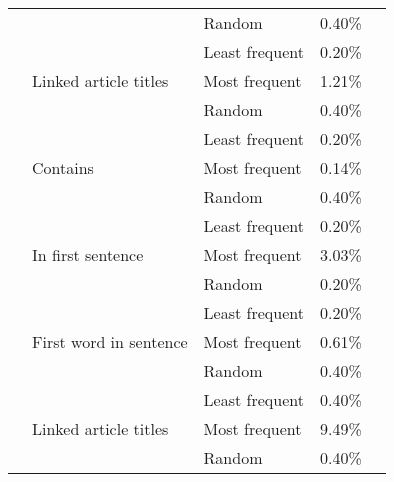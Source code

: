 \begin{center}
\begin{table}[h]
\begin{tabular}{cllll}
\multicolumn{1}{l}{}                                    &                                         & Random                      & 0.40\%  \\ \cline{2-4} 
\multicolumn{1}{l}{}                                    & \multirow{3}{*}{Linked article titles}  & Least frequent              & 0.20\%  \\ \cline{3-4} 
\multicolumn{1}{l}{}                                    &                                         & Most frequent               & 1.21\%  \\ \cline{3-4} 
\multicolumn{1}{l}{}                                    &                                         & Random                      & 0.40\%  \\ \cline{1-4} 
\multicolumn{1}{l}{} \multirow{12}{*}{Case-insensitive} & \multirow{3}{*}{Contains}               & Least frequent              & 0.20\%  \\ \cline{3-4} 
\multicolumn{1}{l}{}                                    &                                         & Most frequent               & 0.14\%  \\ \cline{3-4} 
\multicolumn{1}{l}{}                                    &                                         & Random                      & 0.40\%  \\ \cline{2-4} 
\multicolumn{1}{l}{}                                    & \multirow{3}{*}{In first sentence}      & Least frequent              & 0.20\%  \\ \cline{3-4} 
\multicolumn{1}{l}{}                                    &                                         & Most frequent               & 3.03\%  \\ \cline{3-4} 
\multicolumn{1}{l}{}                                    &                                         & Random                      & 0.20\%  \\ \cline{2-4} 
\multicolumn{1}{l}{}                                    & \multirow{3}{*}{First word in sentence} & Least frequent              & 0.20\%  \\ \cline{3-4} 
\multicolumn{1}{l}{}                                    &                                         & Most frequent               & 0.61\%  \\ \cline{3-4} 
\multicolumn{1}{l}{}                                    &                                         & Random                      & 0.40\%  \\ \cline{2-4} 
\multicolumn{1}{l}{}                                    & \multirow{3}{*}{Linked article titles}  & Least frequent              & 0.40\%  \\ \cline{3-4} 
\multicolumn{1}{l}{}                                    &                                         & Most frequent               & 9.49\%  \\ \cline{3-4} 
\multicolumn{1}{l}{}									   &                                         & Random                      & 0.40\%  \\ \hline
\end{tabular}
\end{table}
\end{center}

